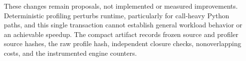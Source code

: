 These changes remain proposals, not implemented or measured improvements.
Deterministic profiling perturbs runtime, particularly for call-heavy Python
paths, and this single transaction cannot establish general workload behavior
or an achievable speedup. The compact artifact
 records frozen source and
profiler source hashes, the raw profile hash, independent closure checks,
nonoverlapping costs, and the instrumented engine counters.
